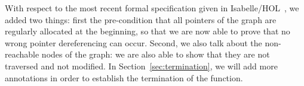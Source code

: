 With respect to the most recent formal specification given in
Isabelle/HOL~\cite{mehta03cade}, we added two things: first the
pre-condition that all pointers of the graph are regularly
allocated at the beginning, so that we are now able to prove that no
wrong pointer dereferencing can occur. Second, we also talk about the
non-reachable nodes of the graph: we are also able to show that they
are not traversed and not modified. In Section~\ref{sec:termination},
we will add more annotations in order to establish the termination of the
function.


